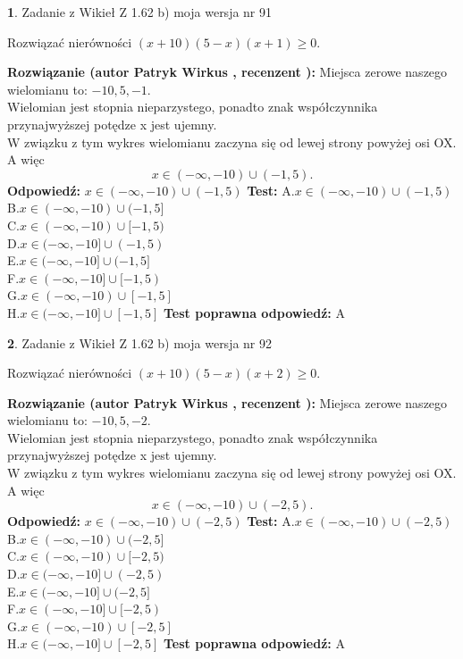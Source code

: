 \documentclass[12pt, a4paper]{article}
\theoremstyle{definition} %
\newtheorem{zad}{}
\newcommand{\zadStart}[1]{\begin{zad}#1\newline}
\newcommand{\zadStop}{\end{zad}}
\newcommand{\rozwStart}[2]{\noindent \textbf{Rozwiązanie (autor #1 , recenzent #2): }\newline}
\newcommand{\rozwStop}{\newline}
\newcommand{\odpStart}{\noindent \textbf{Odpowiedź:}\newline}
\newcommand{\odpStop}{\newline}
\newcommand{\testStart}{\noindent \textbf{Test:}\newline}
\newcommand{\testStop}{\newline}
\newcommand{\kluczStart}{\noindent \textbf{Test poprawna odpowiedź:}\newline}
\newcommand{\kluczStop}{\newline}
\begin{document}
\zadStart{Zadanie z Wikieł Z 1.62 b) moja wersja nr 91}

Rozwiązać nierówności $(x+10)(5-x)(x+1)\ge0$.
\zadStop
\rozwStart{Patryk Wirkus}{}
Miejsca zerowe naszego wielomianu to: $-10, 5, -1$.\\
Wielomian jest stopnia nieparzystego, ponadto znak współczynnika przy\linebreak najwyższej potędze x jest ujemny.\\ W związku z tym wykres wielomianu zaczyna się od lewej strony powyżej osi OX. A więc $$x \in (-\infty,-10) \cup (-1,5).$$
\rozwStop
\odpStart
$x \in (-\infty,-10) \cup (-1,5)$
\odpStop
\testStart
A.$x \in (-\infty,-10) \cup (-1,5)$\\
B.$x \in (-\infty,-10) \cup (-1,5]$\\
C.$x \in (-\infty,-10) \cup [-1,5)$\\
D.$x \in (-\infty,-10] \cup (-1,5)$\\
E.$x \in (-\infty,-10] \cup (-1,5]$\\
F.$x \in (-\infty,-10] \cup [-1,5)$\\
G.$x \in (-\infty,-10) \cup [-1,5]$\\
H.$x \in (-\infty,-10] \cup [-1,5]$
\testStop
\kluczStart
A
\kluczStop



\zadStart{Zadanie z Wikieł Z 1.62 b) moja wersja nr 92}

Rozwiązać nierówności $(x+10)(5-x)(x+2)\ge0$.
\zadStop
\rozwStart{Patryk Wirkus}{}
Miejsca zerowe naszego wielomianu to: $-10, 5, -2$.\\
Wielomian jest stopnia nieparzystego, ponadto znak współczynnika przy\linebreak najwyższej potędze x jest ujemny.\\ W związku z tym wykres wielomianu zaczyna się od lewej strony powyżej osi OX. A więc $$x \in (-\infty,-10) \cup (-2,5).$$
\rozwStop
\odpStart
$x \in (-\infty,-10) \cup (-2,5)$
\odpStop
\testStart
A.$x \in (-\infty,-10) \cup (-2,5)$\\
B.$x \in (-\infty,-10) \cup (-2,5]$\\
C.$x \in (-\infty,-10) \cup [-2,5)$\\
D.$x \in (-\infty,-10] \cup (-2,5)$\\
E.$x \in (-\infty,-10] \cup (-2,5]$\\
F.$x \in (-\infty,-10] \cup [-2,5)$\\
G.$x \in (-\infty,-10) \cup [-2,5]$\\
H.$x \in (-\infty,-10] \cup [-2,5]$
\testStop
\kluczStart
A
\kluczStop
\end{document}
